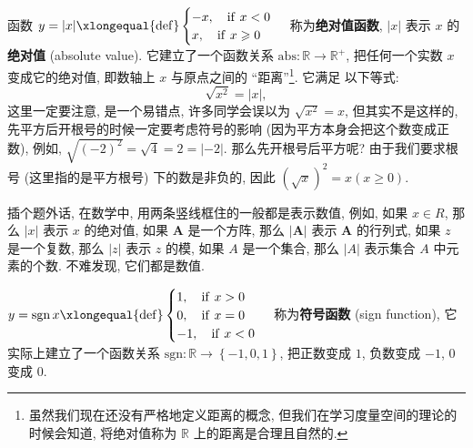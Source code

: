\documentclass[10pt,UTF8]{book} %
\begin{document}
\begin{example}
    函数 $y = |x| \xlongequal{\mathrm{def}} \begin{cases}
        -x, \quad \mathrm{if} \,\, x<0 \\
        x, \quad \mathrm{if} \,\, x\geqslant 0
    \end{cases}$
    称为\textbf{绝对值函数}, $\left| x \right|$ 表示 $x$ 的\textbf{绝对值}
    (absolute value). 它建立了一个函数关系 $\mathrm{abs}: \mathbb{R} \to \mathbb{R}^+$, 
    把任何一个实数 $x$ 变成它的绝对值, 即数轴上 $x$ 与原点之间的 “距离”\footnote{
        虽然我们现在还没有严格地定义距离的概念, 但我们在学习度量空间的理论的时候会知道,
        将绝对值称为 $\mathbb{R}$ 上的距离是合理且自然的.
    }. 它满足
    以下等式:
    \[ \boxed{\sqrt{x^2} = |x|}, \]
    这里一定要注意, 是一个易错点, 许多同学会误以为 $\sqrt{x^2} = x$, 但其实不是这样的,
    先平方后开根号的时候一定要考虑符号的影响 (因为平方本身会把这个数变成正数),
    例如, $\sqrt{(-2)^2} = \sqrt{4} = 2 = |-2|$.
    那么先开根号后平方呢? 由于我们要求根号 (这里指的是平方根号) 下的数是非负的,
    因此 $\left( \sqrt x \right)^2 = x \left( x \geqslant 0 \right)$.
\end{example}

插个题外话, 在数学中, 用两条竖线框住的一般都是表示数值, 例如, 如果 $x \in R$, 
那么 $|x|$ 表示
$x$ 的绝对值, 如果 $\boldsymbol{A}$ 是一个方阵, 那么 $|\boldsymbol{A}|$ 表示
$\boldsymbol{A}$ 的行列式, 如果 $z$ 是一个复数, 那么 $|z|$ 表示 $z$ 的模, 如果
$A$ 是一个集合, 那么 $|A|$ 表示集合 $A$ 中元素的个数. 不难发现, 它们都是数值.

\begin{example}
    $y = \mathrm{sgn} \, x \xlongequal{\mathrm{def}} \begin{cases}
        1, \quad \mathrm{if} \,\, x>0 \\ 
        0, \quad \mathrm{if} \,\,  x=0 \\ 
        -1, \quad \mathrm{if} \,\, x<0
    \end{cases}$ 称为\textbf{符号函数} (sign function), 它实际上建立了一个函数关系
    $\mathrm{sgn}: \mathbb{R} \to \left\{ -1,0,1 \right\}$,
    把正数变成 $1$,
    负数变成 $-1$, $0$ 变成 $0$.
\end{example}
\end{document}
